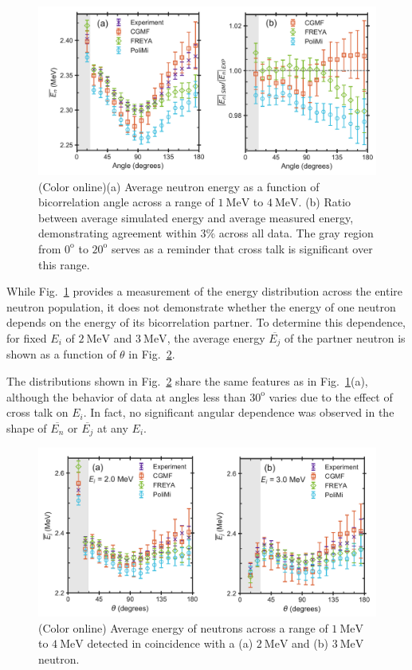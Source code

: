 \documentclass[preprint,12pt]{elsarticle}
\newcommand{\fig}[1]     {Fig.~\ref{#1}}
\newcommand{\coloronline}     {(Color online)\xspace}
\newcommand{\Ei}{\ensuremath{E_i}\xspace}
\newcommand{\Eave}{\ensuremath{\overline{E_n}}\xspace}
\newcommand{\Ejave}{\ensuremath{\overline{E_j}}\xspace}
\newcommand{\genunit}[2]{\ensuremath{#1~\text{#2}}\xspace}
\newcommand{\MeV}[1]    {\genunit{#1}{MeV}}
\newcommand{\degrees}[1]{\ensuremath{#1^{\mathrm{o}}}\xspace}
\begin{document}
\begin{figure}[!t]	
	\centering
	\includegraphics[trim={0cm 0cm 0cm 0cm},clip,width=7in]{Esum_figs.png}
	
	\caption{\coloronline (a) Average neutron energy as a function of bicorrelation angle across a range of \MeV{1} to \MeV{4}. (b) Ratio between average simulated energy and average measured energy, demonstrating agreement within 3\% across all data. The gray region from \degrees{0} to \degrees{20} serves as a reminder that cross talk is significant over this range.}
	\label{fig:Esum}
\end{figure}

While \fig{fig:Esum} provides a measurement of the energy distribution across the entire neutron population, it does not demonstrate whether the energy of one neutron depends on the energy of its bicorrelation partner. To determine this dependence, for fixed \Ei of \MeV{2} and \MeV{3}, the average energy \Ejave of the partner neutron is shown as a function of $\theta$ in \fig{fig:Ejave_vs_theta}. 

The distributions shown in \fig{fig:Ejave_vs_theta} share the same features as in \fig{fig:Esum}(a), although the behavior of data at angles less than \degrees{30} varies due to the effect of cross talk on \Ei. In fact, no significant angular dependence was observed in the shape of \Eave or \Ejave at any \Ei. 

\begin{figure}[!t]
	\centering	
	\includegraphics[trim={0cm 0cm 0cm 0cm},clip,width=7in]{Eave_at_2_3.png}
	\caption{\coloronline Average energy of neutrons across a range of \MeV{1} to \MeV{4} detected in coincidence with a (a) \MeV{2} and (b) \MeV{3} neutron.}
	\label{fig:Ejave_vs_theta}
\end{figure}
\end{document}
